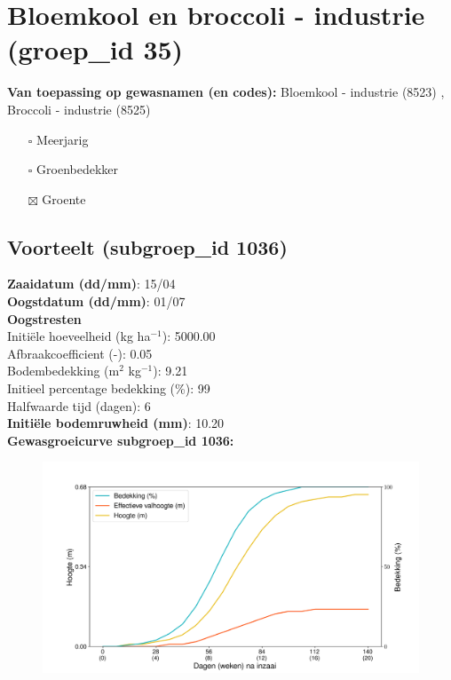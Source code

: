 \documentclass{article}
\begin{document}
 \section{Bloemkool en broccoli - industrie (groep\_id 35)} 
 \textbf{Van toepassing op gewasnamen (en codes):} Bloemkool - industrie (8523) , Broccoli - industrie (8525) 
 \begin{multicols}{3} \begin{itemize} \item[$\square$] Meerjarig \item[$\square$] Groenbedekker \item[$\boxtimes$] Groente \end{itemize} \end{multicols} 
 \subsection{Voorteelt (subgroep\_id 1036)} 
  \textbf{Zaaidatum (dd/mm)}: 15/04  \vspace{0.10cm} \\ 
  \textbf{Oogstdatum (dd/mm)}: 01/07  \vspace{0.10cm} \\ 
  \textbf{Oogstresten} \vspace{0.05cm} \\ 
  \tab Initi\"{e}le hoeveelheid (kg ha$^{-1}$): 5000.00 \vspace{0.05cm} \\ 
  \tab Afbraakcoefficient (-): 0.05 \vspace{0.05cm} \\ 
  \tab Bodembedekking (m$^2$ kg$^{-1}$): 9.21 \vspace{0.05cm} \\ 
  \tab Initieel percentage bedekking (\%): 99 \vspace{0.05cm} \\ 
  \tab Halfwaarde tijd (dagen): 6 \vspace{0.05cm} \\ 
  \textbf{Initi\"{e}le bodemruwheid (mm)}: 10.20 \vspace{0.05cm} \\ 
  \textbf{Gewasgroeicurve subgroep\_id 1036:} 
 \begin{center} \begin{figure}[H] \includegraphics[width=12.5cm]{temp/1036.png} \end{figure} \end{center} 
\end{document}
